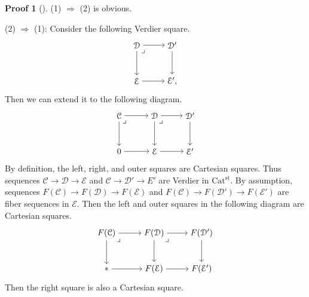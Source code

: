 \documentclass[a4paper,dvipdfmx,11pt,reqno]{amsart}
\newcommand{\C}{\mathcal{C}}
\newcommand{\D}{\mathcal{D}}
\newcommand{\E}{\mathcal{E}}
\newcommand{\Catst}{\mathrm{Cat^{st}}}
\theoremstyle{definition}
\newtheorem{newproof}[theorem]{Proof}
\begin{document}
\begin{newproof}[] \label{proof_of_CDH23.prop.1.5.5}
  (1) $\Rightarrow$ (2) is obvious.

  (2) $\Rightarrow$ (1): 
  Consider the following Verdier square.
  \[\begin{tikzpicture}[auto,->] 
    \node (tl) at (0,1.5) {$\D$}; 
    \node (tr) at (1.5,1.5) {$\D'$};
    \node (bl) at (0,0) {$\E$}; 
    \node (br) at (1.5,0) {$\E',$}; 
    \draw (tl) -- node {} (tr); 
    \draw (bl) -- node[swap] {} (br); 
    \draw (tl) -- node[swap] {} (bl);
    \draw (tr) -- node {} (br); 
    \node at (tl.south east) {$\lrcorner$};
  \end{tikzpicture}\]
  Then we can extend it to the following diagram.
  \[\begin{tikzpicture}[auto,->] 
    \node (tl) at (0,1.5) {$\C$};
    \node (tm) at (1.5,1.5) {$\D$}; 
    \node (tr) at (3,1.5) {$\D'$};
    \node (bl) at (0,0) {$0$}; 
    \node (bm) at (1.5,0) {$\E$};
    \node (br) at (3,0) {$\E'$}; 
    \draw (tl) -- node {} (tm); 
    \draw (tm) -- node {} (tr); 
    \draw (bl) -- node[swap] {} (bm); 
    \draw (bm) -- node[swap] {} (br); 
    \draw (tl) -- node[swap] {} (bl);
    \draw (tm) -- node {} (bm);
    \draw (tr) -- node {} (br);
    \node at (tl.south east) {$\lrcorner$};
    \node at (tm.south east) {$\lrcorner$};
  \end{tikzpicture}\]
  By definition, the left, right, and outer squares are Cartesian squares.
  Thus sequences $\C \to \D \to \E$ and $\C \to \D' \to E'$ are Verdier in $\Catst$.
  By assumption, sequences $F(\C) \to F(\D) \to F(\E)$ and $F(\C) \to F(\D') \to F(\E')$ are fiber sequences in $\E$.
  Then the left and outer squares in the following diagram are Cartesian squares. 
  \[\begin{tikzpicture}[auto,->] 
    \node (tl) at (0,1.5) {$F(\C)$};
    \node (tm) at (2,1.5) {$F(\D)$}; 
    \node (tr) at (4,1.5) {$F(\D')$};
    \node (bl) at (0,0) {$\ast$}; 
    \node (bm) at (2,0) {$F(\E)$};
    \node (br) at (4,0) {$F(\E')$}; 
    \draw (tl) -- node {} (tm); 
    \draw (tm) -- node {} (tr); 
    \draw (bl) -- node[swap] {} (bm); 
    \draw (bm) -- node[swap] {} (br); 
    \draw (tl) -- node[swap] {} (bl);
    \draw (tm) -- node {} (bm);
    \draw (tr) -- node {} (br);
    \node at (tl.south east) {$\lrcorner$};
    \node at (tm.south east) {$\lrcorner$};
  \end{tikzpicture}\]
  Then the right square is also a Cartesian square.
\end{newproof}
\end{document}
